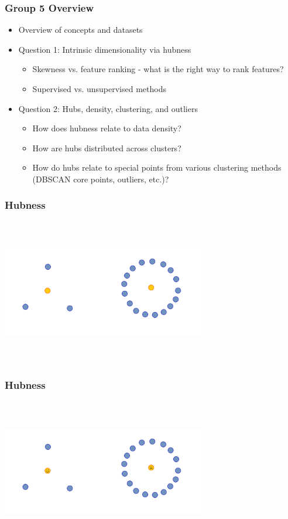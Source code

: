 \documentclass{beamer}
\begin{document}
\begin{frame}
\frametitle{Group 5 Overview}

\begin{itemize}
\item Overview of concepts and datasets
\item Question 1: Intrinsic dimensionality via hubness
\begin{itemize}
\item{Skewness vs. feature ranking - what is the right way to rank features?}
\item{Supervised vs. unsupervised methods} 
\end{itemize}
\item Question 2: Hubs, density, clustering, and outliers
\begin{itemize}
\item How does hubness relate to data density?
\item How are hubs distributed across clusters?
\item How do hubs relate to special points from various clustering methods (DBSCAN core points, outliers, etc.)?
\end{itemize}
\end{itemize}

\end{frame}


\begin{frame}
\frametitle{Hubness}

\centering
\includegraphics[width=3.5in,height=2.5in]{./fig/hubness_def_1.png}

\end{frame}

\begin{frame}
\frametitle{Hubness}

\centering
\includegraphics[width=3.5in,height=2.5in]{./fig/hubness_def_2.png}

\end{frame}
\end{document}
